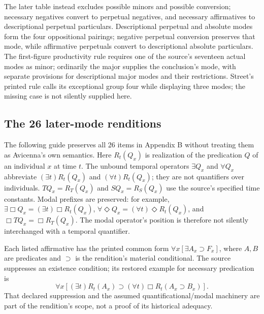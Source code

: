 The later table instead excludes possible
minors and possible conversion; necessary
negatives convert to perpetual negatives,
and necessary affirmatives to descriptional
perpetual particulars. Descriptional perpetual
and absolute modes form the four oppositional
pairings; negative perpetual conversion
preserves that mode, while affirmative
perpetuals convert to descriptional absolute
particulars. The first-figure productivity
rule requires one of the source's seventeen
actual modes as minor; ordinarily
the major supplies the conclusion's mode,
with separate provisions for descriptional
major modes and their restrictions. Street's
printed rule calls its exceptional group
four while displaying three modes; the
missing case is not silently supplied here.
\cite[p.~592]{Street2004ArabicLogicHHL}

\subsection{The 26 later-mode renditions}

The following guide preserves all 26 items in
Appendix B without treating them as Avicenna's
own semantics. Here \(R_t(Q_x)\) is realization
of the predication \(Q\) of an individual \(x\)
at time \(t\). The unbound temporal operators
\(\exists Q_x\) and \(\forall Q_x\) abbreviate
\((\exists t)R_t(Q_x)\) and \((\forall t)R_t(Q_x)\);
they are not quantifiers over individuals.
\(TQ_x=R_T(Q_x)\) and \(SQ_x=R_S(Q_x)\)
use the source's specified time constants.
Modal prefixes are preserved: for example,
\(\exists\Box Q_x=(\exists t)\Box R_t(Q_x)\),
\(\forall\Diamond Q_x=(\forall t)\Diamond R_t(Q_x)\),
and \(\Box TQ_x=\Box R_T(Q_x)\).
The modal operator's position is therefore
not silently interchanged with a temporal quantifier.
\cite[pp.~593--595]{Street2004ArabicLogicHHL}

Each listed affirmative has the printed common
form \(\forall x[\exists A_x\supset F_x]\),
where \(A,B\) are predicates and \(\supset\)
is the rendition's material conditional.
The source suppresses an existence condition;
its restored example for necessary predication is
\[
 \forall x[(\exists t)R_t(A_x)\supset
          (\forall t)\Box R_t(A_x\supset B_x)].
\]
That declared suppression and the assumed
quantificational/modal machinery are part
of the rendition's scope, not a proof of
its historical adequacy.

